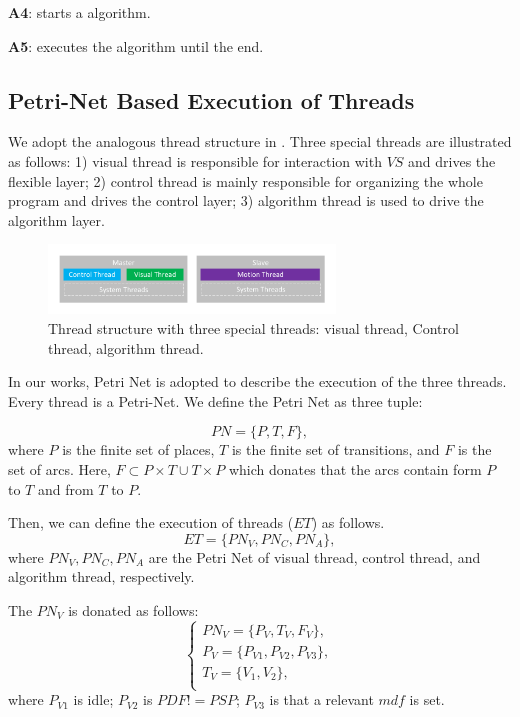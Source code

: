 \documentclass[journal,UTF8]{IEEEtran}
\begin{document}
\textbf{A4}: starts a algorithm.

\textbf{A5}: executes the algorithm until the end. 

\subsection{Petri-Net Based Execution of Threads}
We adopt the analogous thread structure in \cite{wu2018customized}. Three special threads are illustrated as follows: 1) visual thread is responsible for interaction with $VS$ and drives the flexible layer; 2) control thread is mainly responsible for organizing the whole program and drives the control layer; 3) algorithm thread is used to drive the algorithm layer.

\begin{figure}
	\centering
	\includegraphics[width=3in]{fig/Threads.pdf}
	\caption{ Thread structure with three special threads: visual thread, Control thread, algorithm thread.}
	\label{fig:Threads}
\end{figure}

  In our works, Petri Net is adopted to describe the execution of the three threads. Every thread is a Petri-Net. We define the Petri Net as three tuple:
 
 \begin{equation}
PN = \{P,T,F\},
 \end{equation} 
 where $P$ is the finite set of places, $T$ is the finite set of transitions, and $F$ is the set of arcs. Here, $F \subset P\times T \cup T\times P$ which donates that the arcs contain form $P$ to $T$ and from $T$ to $P$.
 
 Then, we can define the execution of threads ($ET$) as follows.
 \begin{equation}
ET = \{PN_V,PN_C,PN_A\},
\end{equation} 
where $PN_V,PN_C,PN_A$ are the Petri Net of visual thread, control thread, and algorithm thread, respectively.

The $PN_V$ is donated as follows:
 \begin{equation}
\left\{
\begin{array}{l}
PN_V= \{P_V,T_V,F_V\},\\
P_V=\{P_{V1}, P_{V2}, P_{V3}\},\\
T_V=\{V_1,V_2\},\\
\end{array}
\right.
\end{equation} 
where $P_{V1}$ is idle; $P_{V2}$ is $PDF != PSP$; $P_{V3}$ is that a relevant $mdf$ is set.
\end{document}
